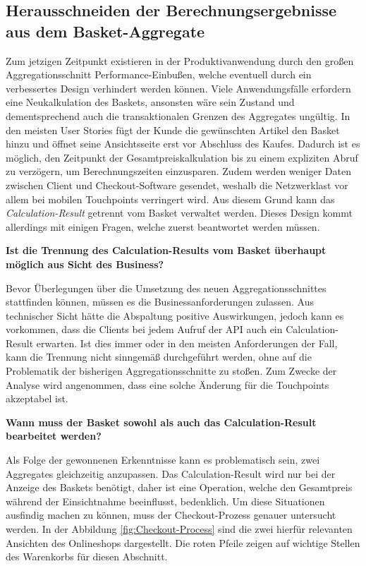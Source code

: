 \subsection{Herausschneiden der Berechnungsergebnisse aus dem Basket-Aggregate}

Zum jetzigen Zeitpunkt existieren in der Produktivanwendung durch den großen Aggregationsschnitt Performance-Einbußen, welche eventuell durch ein verbessertes Design verhindert werden können. Viele Anwendungsfälle erfordern eine Neukalkulation des Baskets, ansonsten wäre sein Zustand und dementsprechend auch die transaktionalen Grenzen des Aggregates ungültig. In den meisten User Stories fügt der Kunde die gewünschten Artikel den Basket hinzu und öffnet seine Ansichtsseite erst vor Abschluss des Kaufes. Dadurch ist es möglich, den Zeitpunkt der Gesamtpreiskalkulation bis zu einem expliziten Abruf zu verzögern, um Berechnungszeiten einzusparen. Zudem werden weniger Daten zwischen Client und Checkout-Software gesendet, weshalb die Netzwerklast vor allem bei mobilen Touchpoints verringert wird. Aus diesem Grund kann das \emph{Calculation-Result} getrennt vom Basket verwaltet werden. Dieses Design kommt allerdings mit einigen Fragen, welche zuerst beantwortet werden müssen.

\textbf{Ist die Trennung des Calculation-Results vom Basket überhaupt möglich aus Sicht des Business?}

Bevor Überlegungen über die Umsetzung des neuen Aggregationsschnittes stattfinden können, müssen es die Businessanforderungen zulassen. Aus technischer Sicht hätte die Abspaltung positive Auswirkungen, jedoch kann es vorkommen, dass die Clients bei jedem Aufruf der API auch ein Calculation-Result erwarten. Ist dies immer oder in den meisten Anforderungen der Fall, kann die Trennung nicht sinngemäß durchgeführt werden, ohne auf die Problematik der bisherigen Aggregationsschnitte zu stoßen. Zum Zwecke der Analyse wird angenommen, dass eine solche Änderung für die Touchpoints akzeptabel ist.

\textbf{Wann muss der Basket sowohl als auch das Calculation-Result bearbeitet werden?}

Als Folge der gewonnenen Erkenntnisse kann es problematisch sein, zwei Aggregates gleichzeitig anzupassen. Das Calculation-Result wird nur bei der Anzeige des Baskets benötigt, daher ist eine Operation, welche den Gesamtpreis während der Einsichtnahme beeinflusst, bedenklich. Um diese Situationen ausfindig machen zu können, muss der Checkout-Prozess genauer untersucht werden. In der Abbildung \ref{fig:Checkout-Process} sind die zwei hierfür relevanten Ansichten des Onlineshops dargestellt. Die roten Pfeile zeigen auf wichtige Stellen des Warenkorbs für diesen Abschnitt.

